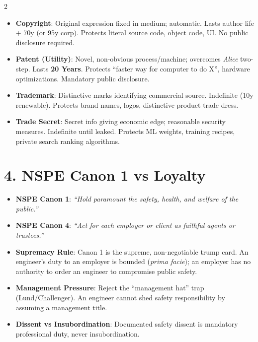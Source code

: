 \documentclass[9pt,a4paper]{extarticle}
\begin{document}
\begin{multicols}{2}
\begin{tcolorbox}[compact,colframe=primary,title={3.7 IP Protection Selector}]
\begin{itemize}[leftmargin=9pt]
  \item \textbf{Copyright}: Original expression fixed in medium; automatic. Lasts author life + 70y (or 95y corp). Protects literal source code, object code, UI. No public disclosure required.
  \item \textbf{Patent (Utility)}: Novel, non-obvious process/machine; overcomes \textit{Alice} two-step. Lasts \textbf{20 Years}. Protects ``faster way for computer to do X'', hardware optimizations. Mandatory public disclosure.
  \item \textbf{Trademark}: Distinctive marks identifying commercial source. Indefinite (10y renewable). Protects brand names, logos, distinctive product trade dress.
  \item \textbf{Trade Secret}: Secret info giving economic edge; reasonable security measures. Indefinite until leaked. Protects ML weights, training recipes, private search ranking algorithms.
\end{itemize}
\end{tcolorbox}

\section{4. NSPE Canon 1 vs Loyalty}

\begin{tcolorbox}[alertbox,title={The Lexicographical Supremacy Principle}]
\begin{itemize}[leftmargin=9pt]
  \item \textbf{NSPE Canon 1}: \textit{``Hold paramount the safety, health, and welfare of the public.''}
  \item \textbf{NSPE Canon 4}: \textit{``Act for each employer or client as faithful agents or trustees.''}
  \item \textbf{Supremacy Rule}: Canon 1 is the supreme, non-negotiable trump card. An engineer's duty to an employer is bounded (\textit{prima facie}); an employer has no authority to order an engineer to compromise public safety.
  \item \textbf{Management Pressure}: Reject the ``management hat'' trap (Lund/Challenger). An engineer cannot shed safety responsibility by assuming a management title.
  \item \textbf{Dissent vs Insubordination}: Documented safety dissent is mandatory professional duty, never insubordination.
\end{itemize}
\end{tcolorbox}


\end{multicols}
\end{document}
